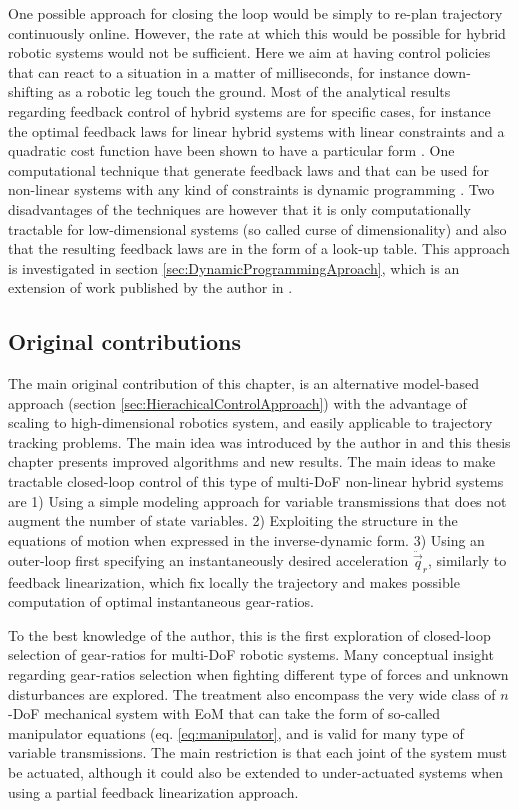 One possible approach for closing the loop would be simply to re-plan trajectory continuously online. However, the rate at which this would be possible for hybrid robotic systems would not be sufficient. Here we aim at having control policies that can react to a situation in a matter of milliseconds, for instance down-shifting as a robotic leg touch the ground. Most of the analytical results regarding feedback control of hybrid systems are for specific cases, for instance the optimal feedback laws for linear hybrid systems with linear constraints and a quadratic cost function have been shown to have a particular form \cite{borrelli_dynamic_2005}. One computational technique that generate feedback laws and that can be used for non-linear systems with any kind of constraints is dynamic programming \cite{donald_e._kirk_optimal_2004}. Two disadvantages of the techniques are however that it is only computationally tractable for low-dimensional systems (so called curse of dimensionality) and also that the resulting feedback laws are in the form of a look-up table. This approach is investigated in section \ref{sec:DynamicProgrammingAproach}, which is an extension of work published by the author in \cite{girard_practical_2016}.

\subsection{Original contributions}
\label{sec:maincont}

The main original contribution of this chapter, is an alternative model-based approach (section \ref{sec:HierachicalControlApproach}) with the advantage of scaling to high-dimensional robotics system, and easily applicable to trajectory tracking problems. The main idea was introduced by the author in \cite{girard_leveraging_2017} and this thesis chapter presents improved algorithms and new results. The main ideas to make tractable closed-loop control of this type of multi-DoF non-linear hybrid systems are 1) Using a simple modeling approach for variable transmissions that does not augment the number of state variables. 2) Exploiting the structure in the equations of motion when expressed in the inverse-dynamic form.  3) Using an outer-loop first specifying an instantaneously desired acceleration $\ddot{\vec{q}}_r$, similarly to feedback linearization, which fix locally the trajectory and makes possible computation of optimal instantaneous gear-ratios.

To the best knowledge of the author, this is the first exploration of closed-loop selection of gear-ratios for multi-DoF robotic systems. Many conceptual insight regarding gear-ratios selection when fighting different type of forces and unknown disturbances are explored. The treatment also encompass the very wide class of $n$-DoF mechanical system with EoM that can take the form of so-called manipulator equations (eq. \eqref{eq:manipulator}, and is valid for many type of variable transmissions. The main restriction is that each joint of the system must be actuated, although it could also be extended to under-actuated systems when using a partial feedback linearization approach. 


